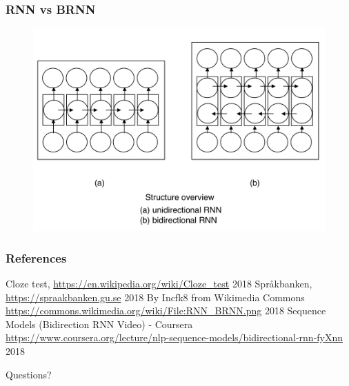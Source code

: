 \documentclass{beamer}
\begin{document}
\begin{frame}
\frametitle{RNN vs BRNN}
\begin{figure}
\includegraphics[scale=0.4]{RNN_BRNN.png}
\caption{\cite{blstm}}
\end{figure}
\end{frame}


\begin{frame}
\frametitle{References}
\footnotesize{
\begin{thebibliography}{1} %
		Cloze test, 
		\url{https://en.wikipedia.org/wiki/Cloze_test}
		2018
	    Språkbanken, 
		\url{https://spraakbanken.gu.se}
		2018	
    By Incfk8 from Wikimedia Commons
    \url{https://commons.wikimedia.org/wiki/File:RNN_BRNN.png}
    2018
    Sequence Models (Bidirection RNN Video) - Coursera
    \url{https://www.coursera.org/lecture/nlp-sequence-models/bidirectional-rnn-fyXnn}
    2018
    
\end{thebibliography}
}
\end{frame}


\begin{frame}
\Huge{\centerline{Questions?}}
\end{frame}

\end{document}
